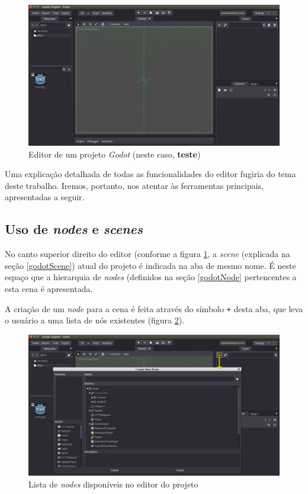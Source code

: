 \begin{figure}[H]
  \centering
  \includegraphics[width=.9\textwidth]{image/in-game-editor}
  \caption{Editor de um projeto \textit{Godot} (neste caso, \textbf{teste})}
  \label{in-game-editor}
\end{figure}

Uma explicação detalhada de todas as funcionalidades do editor fugiria do tema deste trabalho. Iremos, portanto, nos atentar às ferramentas principais, apresentadas a seguir.


\subsection{Uso de \textit{nodes} e \textit{scenes}}

No canto superior direito do editor (conforme a figura \ref{in-game-editor}, a \textit{scene} (explicada na seção \ref{godotScene}) atual do projeto é indicada na aba de mesmo nome. É neste espaço que a hierarquia de \textit{nodes} (definidos na seção \ref{godotNode} pertencentes a esta cena é apresentada.

A criação de um \textit{node} para a cena é feita através do símbolo \texttt{+} desta aba, que leva o usuário a uma lista de nós existentes (figura \ref{editor-node}).

\begin{figure}[H]
  \centering
  \includegraphics[width=.9\textwidth]{image/editor-node-edit}
  \caption{Lista de \textit{nodes} disponíveis no editor do projeto}
  \label{editor-node}
\end{figure}


